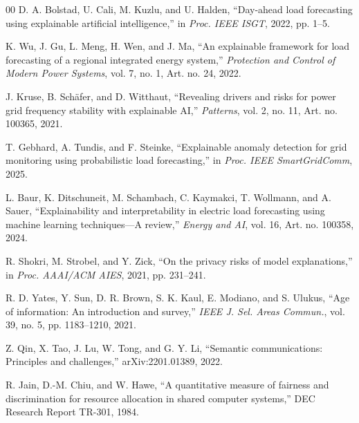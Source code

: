 \documentclass[conference]{IEEEtran}
\begin{document}
\begin{thebibliography}{00}
D. A. Bolstad, U. Cali, M. Kuzlu, and U. Halden, ``Day-ahead load
forecasting using explainable artificial intelligence,'' in
\emph{Proc. IEEE ISGT}, 2022, pp. 1--5.

K. Wu, J. Gu, L. Meng, H. Wen, and J. Ma, ``An explainable framework
for load forecasting of a regional integrated energy system,''
\emph{Protection and Control of Modern Power Systems}, vol. 7, no. 1,
Art. no. 24, 2022.

J. Kruse, B. Sch\"afer, and D. Witthaut, ``Revealing drivers and risks
for power grid frequency stability with explainable AI,'' \emph{Patterns},
vol. 2, no. 11, Art. no. 100365, 2021.

T. Gebhard, A. Tundis, and F. Steinke, ``Explainable anomaly detection
for grid monitoring using probabilistic load forecasting,'' in
\emph{Proc. IEEE SmartGridComm}, 2025.

L. Baur, K. Ditschuneit, M. Schambach, C. Kaymakci, T. Wollmann, and
A. Sauer, ``Explainability and interpretability in electric load
forecasting using machine learning techniques---A review,'' \emph{Energy
and AI}, vol. 16, Art. no. 100358, 2024.

R. Shokri, M. Strobel, and Y. Zick, ``On the privacy risks of model
explanations,'' in \emph{Proc. AAAI/ACM AIES}, 2021, pp. 231--241.

R. D. Yates, Y. Sun, D. R. Brown, S. K. Kaul, E. Modiano, and S. Ulukus,
``Age of information: An introduction and survey,'' \emph{IEEE J. Sel.
Areas Commun.}, vol. 39, no. 5, pp. 1183--1210, 2021.

Z. Qin, X. Tao, J. Lu, W. Tong, and G. Y. Li, ``Semantic communications:
Principles and challenges,'' arXiv:2201.01389, 2022.

R. Jain, D.-M. Chiu, and W. Hawe, ``A quantitative measure of fairness
and discrimination for resource allocation in shared computer systems,''
DEC Research Report TR-301, 1984.

\end{thebibliography}
\end{document}
